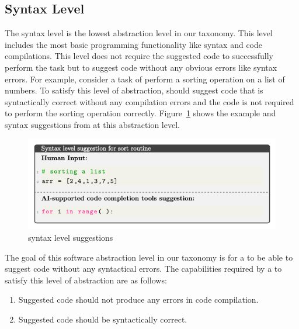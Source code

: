 \subsection{Syntax Level}
\label{syntax}
The syntax level is the lowest abstraction level in our taxonomy. This level includes the most basic programming functionality like syntax and code compilations. This level does not require the \cct{} suggested code to successfully perform the task but to suggest code without any obvious errors like syntax errors.
For example, consider a task of perform a sorting operation on a list of numbers. To satisfy this level of abstraction, \cct{} should suggest code that is syntactically correct without any compilation errors and the code is not required to perform the sorting operation correctly. 
Figure~\ref{fig:syntax} shows the example and syntax suggestions from \cct{} at this abstraction level.

\begin{figure}[hbt!]
    \centering
    \includegraphics[width=\linewidth]{Figures/syntax.png}
    \caption{\cct{} syntax level suggestions}
    \label{fig:syntax}
\end{figure}

The goal of this software abstraction level in our taxonomy is for a \cct{} to be able to suggest code without any syntactical errors.
The capabilities required by a \cct{} to satisfy this level of abstraction are as follows:

\begin{enumerate}
    \item Suggested code should not produce any errors in code compilation.
    \item Suggested code should be syntactically correct.
\end{enumerate}

